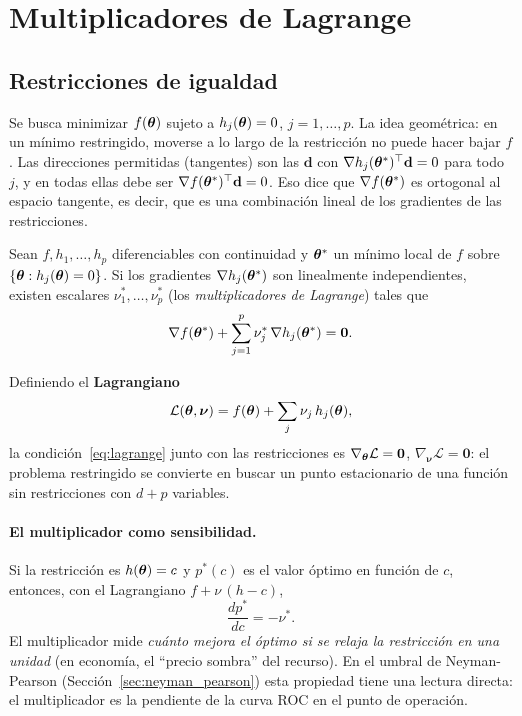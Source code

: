 \section{Multiplicadores de Lagrange}
\label{sec:lagrange}

\subsection{Restricciones de igualdad}

Se busca minimizar $f(\boldsymbol{\theta})$ sujeto a $h_j(\boldsymbol{\theta}) = 0$, $j = 1,\dots,p$. La idea geométrica: en un mínimo
restringido, moverse a lo largo de la restricción no puede hacer bajar $f$. Las direcciones permitidas
(tangentes) son las $\mathbf{d}$ con $\nabla h_j(\boldsymbol{\theta}^*)^\top\mathbf{d} = 0$ para todo $j$, y en todas ellas
debe ser $\nabla f(\boldsymbol{\theta}^*)^\top\mathbf{d} = 0$. Eso dice que $\nabla f(\boldsymbol{\theta}^*)$ es ortogonal al espacio tangente,
es decir, que es una combinación lineal de los gradientes de las restricciones.

\begin{teorema}
\label{teo:lagrange}
Sean $f, h_1,\dots,h_p$ diferenciables con continuidad y $\boldsymbol{\theta}^*$ un mínimo local de $f$ sobre
$\{\boldsymbol{\theta} : h_j(\boldsymbol{\theta}) = 0\}$. Si los gradientes $\nabla h_j(\boldsymbol{\theta}^*)$ son linealmente independientes, existen
escalares $\nu_1^*,\dots,\nu_p^*$ (los \emph{multiplicadores de Lagrange}) tales que
\begin{equation}
  \nabla f(\boldsymbol{\theta}^*) + \sum_{j=1}^{p}\nu_j^*\,\nabla h_j(\boldsymbol{\theta}^*) = \mathbf{0}.
  \label{eq:lagrange}
\end{equation}
\end{teorema}

Definiendo el \textbf{Lagrangiano}
\begin{equation}
  \mathcal{L}(\boldsymbol{\theta}, \boldsymbol\nu) = f(\boldsymbol{\theta}) + \sum_{j}\nu_j\,h_j(\boldsymbol{\theta}),
\end{equation}
la condición~\eqref{eq:lagrange} junto con las restricciones es $\nabla_{\boldsymbol{\theta}}\mathcal{L} = \mathbf{0}$,
$\nabla_{\boldsymbol\nu}\mathcal{L} = \mathbf{0}$: el problema restringido se convierte en buscar un punto
estacionario de una función sin restricciones con $d + p$ variables.

\paragraph{El multiplicador como sensibilidad.} Si la restricción es $h(\boldsymbol{\theta}) = c$ y $p^*(c)$ es el valor
óptimo en función de $c$, entonces, con el Lagrangiano $f + \nu\,(h - c)$,
\begin{equation}
  \frac{dp^*}{dc} = -\nu^*.
  \label{eq:sensibilidad}
\end{equation}
El multiplicador mide \emph{cuánto mejora el óptimo si se relaja la restricción en una unidad}
(en economía, el ``precio sombra'' del recurso). En el umbral de Neyman-Pearson
(Sección~\ref{sec:neyman_pearson}) esta propiedad tiene una lectura directa: el multiplicador es la
pendiente de la curva ROC en el punto de operación.

